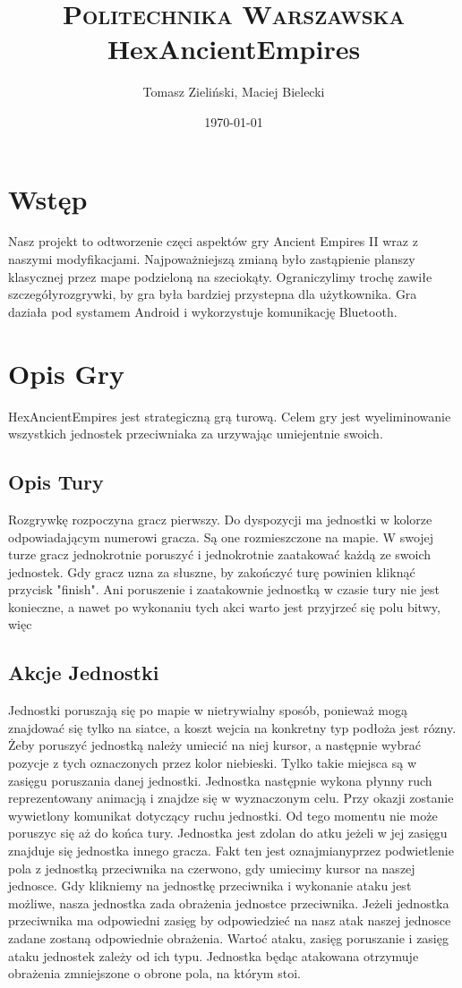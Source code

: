 \documentclass[paper=a4, fontsize=11pt]{scrartcl} %
\title{	
\normalfont \normalsize 
\textsc{Politechnika Warszawska} \\ [25pt] %
\huge HexAncientEmpires \\ %
}
\author{Tomasz Zieliński,  Maciej Bielecki}
\date{\normalsize\today}
\numberwithin{equation}{section} %
\numberwithin{figure}{section} %
\numberwithin{table}{section} %
\begin{document}
\maketitle 

\section{Wstęp}
Nasz projekt to odtworzenie częci aspektów gry Ancient Empires II wraz z naszymi modyfikacjami. Najpoważniejszą zmianą było zastąpienie planszy klasycznej przez mape podzieloną na szeciokąty. Ograniczylimy trochę zawiłe szczegółyrozgrywki, by gra była bardziej przystepna dla użytkownika. Gra daziała pod systamem Android i wykorzystuje komunikację Bluetooth. 

\section{Opis Gry}
HexAncientEmpires jest strategiczną grą turową. Celem gry jest wyeliminowanie wszystkich jednostek przeciwniaka za urzywając umiejentnie swoich. 
\subsection{Opis Tury}
Rozgrywkę rozpoczyna gracz pierwszy. Do dyspozycji ma jednostki w kolorze odpowiadającym numerowi gracza. Są one rozmieszczone na mapie.
 W swojej turze gracz jednokrotnie poruszyć i jednokrotnie zaatakować każdą ze swoich jednostek. Gdy gracz uzna za słuszne, by zakończyć turę powinien kliknąć przycisk "finish". Ani poruszenie i zaatakownie jednostką w czasie tury nie jest konieczne, a nawet po wykonaniu tych akci warto jest przyjrzeć się polu bitwy, więc 
\subsection{Akcje Jednostki}
Jednostki poruszają się po mapie w nietrywialny sposób, ponieważ mogą znajdować się tylko na siatce, a koszt wejcia na konkretny typ podłoża jest rózny. Żeby poruszyć jednostką należy umiecić na niej kursor, a następnie wybrać pozycje z tych oznaczonych przez kolor niebieski. Tylko takie miejsca są w zasięgu poruszania danej jednostki. Jednostka następnie wykona płynny ruch reprezentowany animacją i znajdze się w wyznaczonym celu. Przy okazji zostanie wywietlony komunikat dotyczący ruchu jednostki. Od tego momentu nie może poruszyc się aż do końca tury. Jednostka jest zdolan do atku jeżeli w jej zasięgu znajduje się jednostka innego gracza. Fakt ten jest oznajmianyprzez podwietlenie pola z jednostką przeciwnika na czerwono, gdy umiecimy kursor na naszej jednosce. Gdy klikniemy na jednostkę przeciwnika i wykonanie ataku jest możliwe, nasza jednostka zada obrażenia jednostce przeciwnika. Jeżeli jednostka przeciwnika ma odpowiedni zasięg by odpowiedzieć na nasz atak naszej jednosce zadane zostaną odpowiednie obrażenia. Wartoć ataku, zasięg poruszanie i zasięg ataku jednostek zależy od ich typu. Jednostka będąc atakowana otrzymuje obrażenia zmniejszone o obrone pola, na którym stoi.
\end{document}

